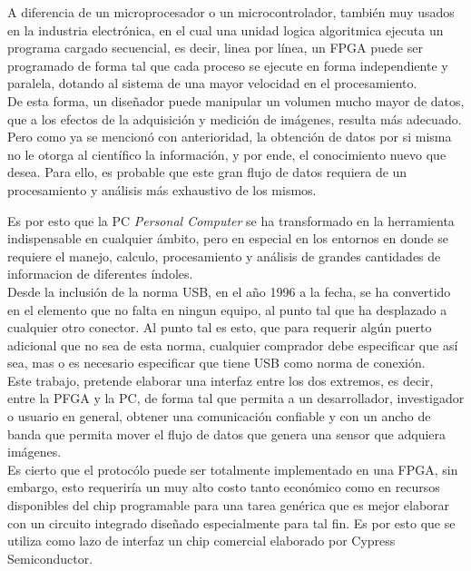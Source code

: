 A diferencia de un microprocesador o un microcontrolador, también muy usados en la industria electrónica, en el cual una unidad logica algoritmica ejecuta un programa cargado secuencial, es decir, linea por línea, un FPGA puede ser programado de forma tal que cada proceso se ejecute en forma independiente y paralela, dotando al sistema de una mayor velocidad en el procesamiento.\\

De esta forma, un diseñador puede manipular un volumen mucho mayor de datos, que a los efectos de la adquisición y medición de imágenes, resulta más adecuado.\\

Pero como ya se mencionó con anterioridad, la obtención de datos por si misma no le otorga al científico la información, y por ende, el conocimiento nuevo que desea. Para ello, es probable que este gran flujo de datos requiera de un procesamiento y análisis más exhaustivo de los mismos.

Es por esto que la PC {\it Personal Computer} se ha transformado en la herramienta indispensable en cualquier ámbito, pero en especial en los entornos en donde se requiere el  manejo, calculo, procesamiento y análisis de grandes cantidades de informacion de diferentes índoles.\\

Desde la inclusión de la norma USB, en el año 1996 a la fecha, se ha convertido en el elemento que no falta en ningun equipo, al punto tal que ha desplazado a cualquier otro conector. Al punto tal es esto, que para requerir algún puerto adicional que no sea de esta norma, cualquier comprador debe especificar que así sea, mas o es necesario especificar que tiene USB como norma de conexión.\\

Este trabajo, pretende elaborar una interfaz entre los dos extremos, es decir, entre la PFGA y la PC, de forma tal que permita a un desarrollador, investigador o usuario en general, obtener una comunicación confiable y con un ancho de banda que permita mover el flujo de datos que genera una sensor que adquiera imágenes.\\

Es cierto que el protocólo puede ser totalmente implementado en una FPGA, sin embargo, esto requeriría un muy alto costo tanto económico como en recursos disponibles del chip programable para una tarea genérica que es mejor elaborar con un circuito integrado diseñado especialmente para tal fin. Es por esto que se utiliza como lazo de interfaz un chip comercial elaborado por Cypress Semiconductor.\\




